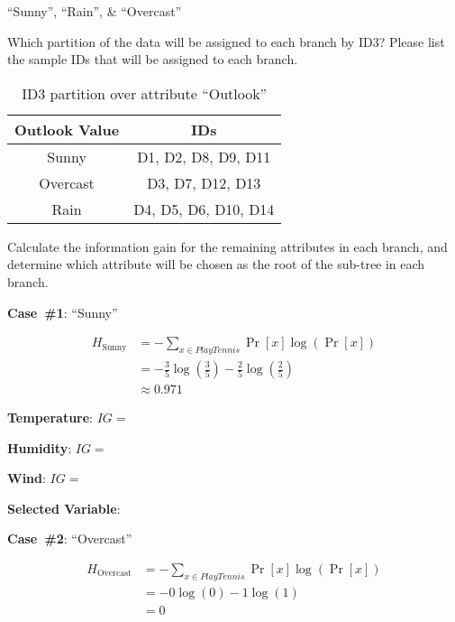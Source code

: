 ``Sunny'', ``Rain'', \& ``Overcast''

\begin{subproblem}
  Which partition of the data will be assigned to each branch by ID3? Please list the sample IDs that will be assigned to each branch.
\end{subproblem}

\begin{table}[h]
  \centering
  \caption{ID3 partition over attribute ``Outlook''}\label{tab:P02:Partition}
  \begin{tabular}{|c|c|}
    \hline
    \textbf{Outlook Value} & \textbf{IDs} \\\hline
    Sunny    & D1, D2, D8, D9, D11 \\\hline
    Overcast & D3, D7, D12, D13 \\\hline
    Rain     & D4, D5, D6, D10, D14 \\\hline
  \end{tabular}
\end{table}

\begin{subproblem}
  Calculate the information gain for the remaining attributes in each branch, and determine which attribute will be chosen as the root of the sub-tree in each branch.
\end{subproblem}

\noindent
{\large \textbf{Case~\#1}: ``Sunny''}

\begin{align*}
  H_{\text{Sunny}} &= -\sum_{x\in PlayTennis} \Pr[x] \log \left(\Pr[x]\right) \\
                   &= - \frac{3}{5} \log\left(\frac{3}{5}\right) - \frac{2}{5} \log\left(\frac{2}{5}\right) \\
                   &\approx 0.971
\end{align*}

\noindent
\textbf{Temperature}: $IG = $

\noindent
\textbf{Humidity}: $IG = $

\noindent
\textbf{Wind}: $IG = $

\begin{center}
  \textbf{Selected Variable}: $\boxed{}$
\end{center}

\noindent
{\large \textbf{Case~\#2}: ``Overcast''}

\begin{align*}
  H_{\text{Overcast}} &= -\sum_{x\in PlayTennis} \Pr[x] \log \left(\Pr[x] \right)\\
                      &= - 0 \log(0) - 1 \log(1) \\
                      &= 0
\end{align*}

